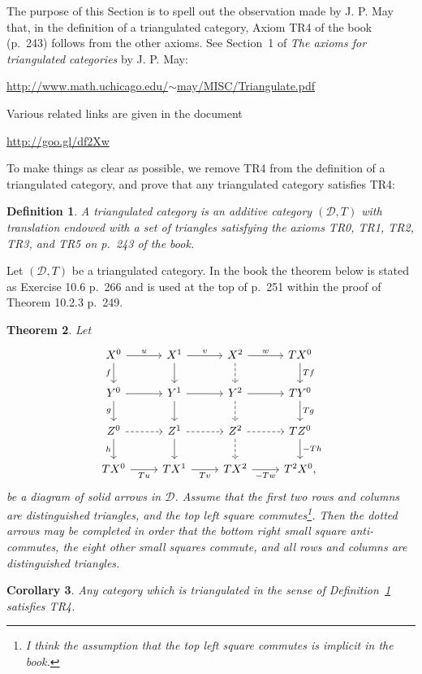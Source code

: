 \documentclass[12pt]{article}%
\newtheorem{thm}{Theorem}%
\newtheorem{cor}[thm]{Corollary}
\newtheorem{df}[thm]{Definition}%
\theoremstyle{remark}
\theoremstyle{definition}
\newcommand{\cc}{\mathcal}
\begin{document}
The purpose of this Section is to spell out the observation made by J. P. May that, in the definition of a triangulated category, Axiom TR4 of the book (p.~243) follows from the other axioms. See Section~1 of {\em The axioms for triangulated categories} by J. P. May:%
%
\begin{center}\href{http://www.math.uchicago.edu/~may/MISC/Triangulate.pdf}{http://www.math.uchicago.edu/$\sim$may/MISC/Triangulate.pdf}%
\end{center}
%
Various related links are given in the document%
%
\begin{center}\href{http://goo.gl/df2Xw}{http://goo.gl/df2Xw}%
\end{center}

To make things as clear as possible, we remove TR4 from the definition of a triangulated category, and prove that any triangulated category satisfies TR4:
%
\begin{df}\label{tr}
A {\em triangulated category} is an additive category $(\cc D,T)$ with translation endowed with a set of triangles satisfying the axioms {\em TR0, TR1, TR2, TR3}, and {\em TR5} on p.~243 of the book.
\end{df}
%
Let $(\cc D,T)$ be a triangulated category. In the book the theorem below is stated as Exercise 10.6 p.~266 and is used at the top of p.~251 within the proof of Theorem 10.2.3 p.~249.
%
\begin{thm}\label{mayt}
Let 
$$
\begin{tikzcd}
X^0\ar{r}{u}\ar{d}[swap]{f}&X^1\ar{d}\ar{r}{v}&X^2\ar[dashed]{d}\ar{r}{w}&TX^0\ar{d}{Tf}\\ 
Y^0\ar{r}\ar{d}[swap]{g}&Y^1\ar{d}\ar{r}&Y^2\ar[dashed]{d}\ar{r}&TY^0\ar{d}{Tg}\\ 
Z^0\ar[dashed]{r}\ar{d}[swap]{h}&Z^1\ar{d}\ar[dashed]{r}&Z^2\ar[dashed]{d}\ar[dashed]{r}&TZ^0\ar{d}{-Th}\\ 
TX^0\ar{r}[swap]{Tu}&TX^1\ar{r}[swap]{Tv}&TX^2\ar{r}[swap]{-Tw}&T^2X^0,
\end{tikzcd}
$$ 
be a diagram of solid arrows in $\cc D$. Assume that the first two rows and columns are distinguished triangles, and the top left square commutes\footnote{I think the assumption that the top left square commutes is implicit in the book.}. Then the dotted arrows may be completed in order that the bottom right small square anti-commutes, the eight other small squares commute, and all rows and columns are distinguished triangles. 
\end{thm}
%
\begin{cor}\label{may}
Any category which is triangulated in the sense of Definition~\ref{tr} satisfies {\em TR4}.
\end{cor} 
\end{document}
